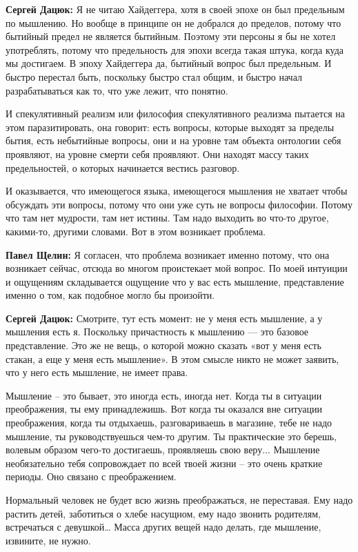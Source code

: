 \textbf{Сергей Дацюк:} Я не читаю Хайдеггера, хотя в своей эпохе он был предельным по
мышлению. Но вообще в принципе он не добрался до пределов, потому что бытийный
предел не является бытийным. Поэтому эти персоны я бы не хотел употреблять,
потому что предельность для эпохи всегда такая штука, когда куда мы достигаем.
В эпоху Хайдеггера да, бытийный вопрос был предельным. И быстро перестал быть,
поскольку быстро стал общим, и быстро начал разрабатываться как то, что уже
лежит, что понятно.

И спекулятивный реализм или философия спекулятивного реализма пытается на этом
паразитировать, она говорит: есть вопросы, которые выходят за пределы бытия,
есть небытийные вопросы, они и на уровне там объекта онтологии себя проявляют,
на уровне смерти себя проявляют. Они находят массу таких предельностей, о
которых начинается вестись разговор.

И оказывается, что имеющегося языка, имеющегося мышления не хватает чтобы
обсуждать эти вопросы, потому что они уже суть не вопросы философии. Потому что
там нет мудрости, там нет истины. Там надо выходить во что-то другое,
какими-то, другими словами. Вот в этом возникает проблема.

\textbf{Павел Щелин:} Я согласен, что проблема возникает именно потому, что она
возникает сейчас, отсюда во многом проистекает мой вопрос. По моей интуиции и
ощущениям складывается ощущение что у вас есть мышление, представление именно о
том, как подобное могло бы произойти.

\textbf{Сергей Дацюк:} Смотрите, тут есть момент: не у меня есть мышление, а у мышления
есть я. Поскольку причастность к мышлению — это базовое представление. Это же
не вещь, о которой можно сказать «вот у меня есть стакан, а еще у меня есть
мышление». В этом смысле никто не может заявить, что у него есть мышление, не
имеет права.

Мышление – это бывает, это иногда есть, иногда нет. Когда ты в ситуации
преображения, ты ему принадлежишь. Вот когда ты оказался вне ситуации
преображения, когда ты отдыхаешь, разговариваешь в магазине, тебе не надо
мышление, ты руководствуешься чем-то другим. Ты практические это берешь,
волевым образом чего-то достигаешь, проявляешь свою веру... Мышление
необязательно тебя сопровождает по всей твоей жизни – это очень краткие
периоды. Оно связано с преображением.

Нормальный человек не будет всю жизнь преображаться, не переставая. Ему надо
растить детей, заботиться о хлебе насущном, ему надо звонить родителям,
встречаться с девушкой… Масса других вещей надо делать, где мышление, извините,
не нужно.

